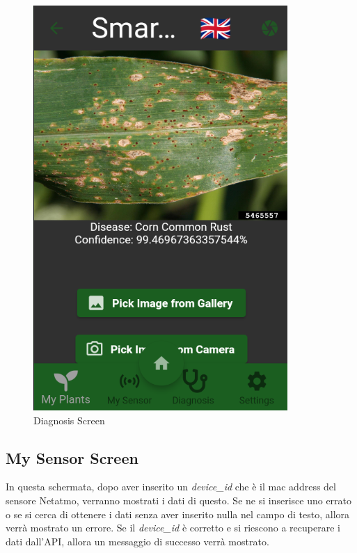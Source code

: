 \documentclass[a4paper,12pt]{report}
\begin{document}
\begin{figure}[ht] 
	\centering
	\includegraphics[width=.3\textwidth, height=.3\textheight, keepaspectratio]{./images/diagnosis/diagnosis_screen.png}
	\caption{Diagnosis Screen}
	\label{fig:diagnosis}
\end{figure}

\subsection{My Sensor Screen}

\textsf{\small In questa schermata, dopo aver inserito un \emph{device\_id} che è il mac address del sensore Netatmo, verranno mostrati i dati di questo.}
\textsf{\small Se ne si inserisce uno errato o se si cerca di ottenere i dati senza aver inserito nulla nel campo di testo, allora verrà mostrato un errore.}
\textsf{\small Se il \emph{device\_id} è corretto e si riescono a recuperare i dati dall'API, allora un messaggio di successo verrà mostrato.}
\end{document}
